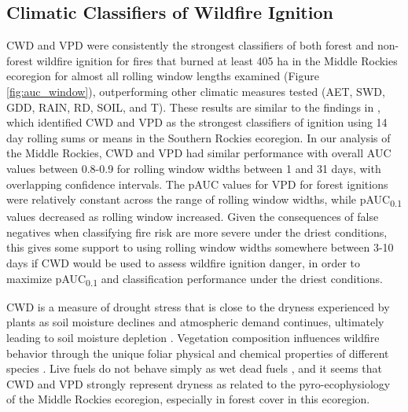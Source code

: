 \documentclass[11p]{article}
\newcommand{\pauc}[1]{pAUC\textsubscript{#1}}
\begin{document}
\subsection{Climatic Classifiers of Wildfire Ignition}
CWD and VPD were consistently the strongest classifiers of both forest and non-forest wildfire ignition for fires that burned at least 405 ha in the Middle Rockies ecoregion for almost all rolling window lengths examined (Figure \ref{fig:auc_window}), outperforming other climatic measures tested (AET, SWD, GDD, RAIN, RD, SOIL, and T). These results are similar to the findings in , which identified CWD and VPD as the strongest classifiers of ignition using 14 day rolling sums or means in the Southern Rockies ecoregion. In our analysis of the Middle Rockies, CWD and VPD had similar performance with overall AUC values between 0.8-0.9 for rolling window widths between 1 and 31 days, with overlapping confidence intervals. The pAUC values for VPD for forest ignitions were relatively constant across the range of rolling window widths, while \pauc{0.1} values decreased as rolling window increased. Given the consequences of false negatives when classifying fire risk are more severe under the driest conditions, this gives some support to using rolling window widths somewhere between 3-10 days if CWD would be used to assess wildfire ignition danger, in order to maximize \pauc{0.1} and classification performance under the driest conditions.

CWD is a measure of drought stress that is close to the dryness experienced by plants as soil moisture declines and atmospheric demand continues, ultimately leading to soil moisture depletion \citep{stephensonActualEvapotranspirationDeficit1998}. Vegetation composition influences wildfire behavior through the unique foliar physical and chemical properties of different species \citep{mattjollySeasonalVariationsRed2016}. Live fuels do not behave simply as wet dead fuels \citep{jollyPyroEcophysiologyShiftingParadigm2018}, and it seems that CWD and VPD strongly represent dryness as related to the pyro-ecophysiology of the Middle Rockies ecoregion, especially in forest cover in this ecoregion. 
\end{document}
